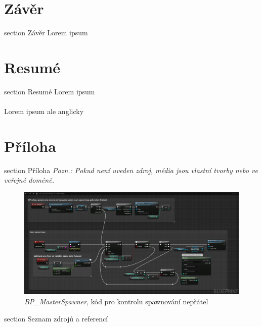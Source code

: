 \documentclass[12pt,a4paper,hidelinks]{article}
\begin{document}
\clearpage
\section*{Závěr}
 {section} {Závěr}
Lorem ipsum

\clearpage

\section*{Resumé}
 {section} {Resumé}
Lorem ipsum\\
\\
Lorem ipsum ale anglicky\\


\clearpage

\section*{Příloha}
 {section} {Příloha}
\textit{Pozn.: Pokud není uveden zdroj, média jsou vlastní tvorby nebo ve veřejné doméně.}

\begin{figure}[h!]
	\centering
	\includegraphics[width=1.0\textwidth]{images/masterspawner_nodesc.png}
	\caption{\textit{BP{\_}MasterSpawner}, kód pro kontrolu spawnování nepřátel}
	\label{masterspawner}
\end{figure}
\clearpage


\printbibliography[title={Seznam zdrojů a referencí}]
 {section} {Seznam zdrojů a referencí}
\end{document}
